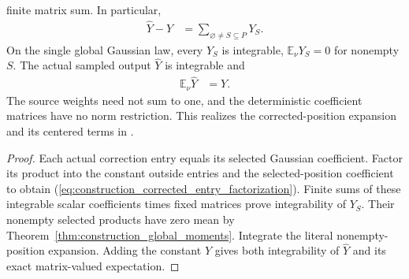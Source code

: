 \begin{theorem}
    finite matrix sum. In particular,
    \begin{align}
        \widehat Y-Y & =\sum_{\varnothing\ne S\subseteq P}Y_S.
        \label{eq:construction_sampled_output_expansion}
    \end{align}
    On the single global Gaussian law, every $Y_S$ is integrable,
    $\mathbb E_\nu Y_S=0$ for nonempty $S$.
    The actual sampled output $\widehat Y$ is integrable and
    \begin{align}
        \mathbb E_\nu\widehat Y & =Y.
        \label{eq:construction_sampled_output_mean}
    \end{align}
    The source weights need not sum to one, and the deterministic
    coefficient matrices have no norm restriction.
    This realizes the corrected-position expansion and its centered
    terms in \cite[Equations~(5.6) and~(5.9)]{OpenAI2026PolynomialPEPS}.
\end{theorem}

\begin{proof}
    \leanok
    Each actual correction entry equals its selected Gaussian
    coefficient. Factor its product into the constant outside entries
    and the selected-position coefficient to obtain
    (\ref{eq:construction_corrected_entry_factorization}).
    Finite sums of these integrable scalar coefficients times fixed
    matrices prove integrability of $Y_S$. Their nonempty selected
    products have zero mean by
    Theorem~\ref{thm:construction_global_moments}.
    Integrate the literal nonempty-position expansion. Adding the
    constant $Y$ gives both integrability of $\widehat Y$ and its
    exact matrix-valued expectation.
\end{proof}

